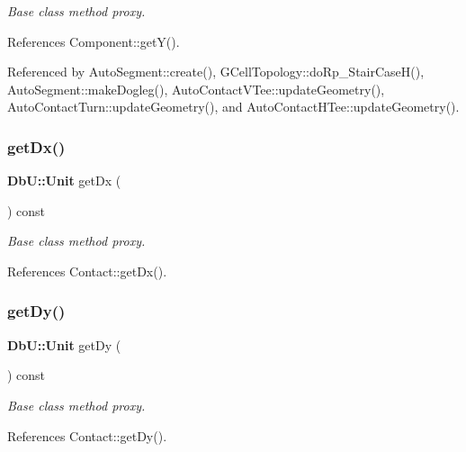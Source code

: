 {\itshape Base class method proxy.} 

References Component\+::get\+Y().



Referenced by Auto\+Segment\+::create(), G\+Cell\+Topology\+::do\+Rp\+\_\+\+Stair\+Case\+H(), Auto\+Segment\+::make\+Dogleg(), Auto\+Contact\+V\+Tee\+::update\+Geometry(), Auto\+Contact\+Turn\+::update\+Geometry(), and Auto\+Contact\+H\+Tee\+::update\+Geometry().

\mbox{\label{classKatabatic_1_1AutoContact_ad1ef5843ef3eabe27e548f24ca222876}} 
\subsubsection{\texorpdfstring{get\+Dx()}{getDx()}}
{\footnotesize\ttfamily \textbf{ Db\+U\+::\+Unit} get\+Dx (\begin{DoxyParamCaption}{ }\end{DoxyParamCaption}) const\hspace{0.3cm}{\ttfamily [inline]}}

{\itshape Base class method proxy.} 

References Contact\+::get\+Dx().

\mbox{\label{classKatabatic_1_1AutoContact_ae4046e6ed80cbba54a48953ef4d2ca6d}} 
\subsubsection{\texorpdfstring{get\+Dy()}{getDy()}}
{\footnotesize\ttfamily \textbf{ Db\+U\+::\+Unit} get\+Dy (\begin{DoxyParamCaption}{ }\end{DoxyParamCaption}) const\hspace{0.3cm}{\ttfamily [inline]}}

{\itshape Base class method proxy.} 

References Contact\+::get\+Dy().

\mbox{\label{classKatabatic_1_1AutoContact_ac2ba7fbe2fad7d4910aa71ee034078e7}} 
